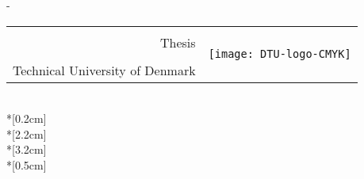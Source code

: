 
\thispagestyle{empty}             %
\calccentering{\unitlength}
\begin{adjustwidth*}{\unitlength}{-\unitlength}
    \begin{adjustwidth}{-0.5cm}{-0.5cm}
        \scshape
        \begin{flushright}
            \scriptsize  %
            \def\arraystretch{1.2}
            \begin{tabular}{rc}
            & \multirow{4}{*}{\texttt{[image: DTU-logo-CMYK]}}\\[-0.1cm]
            \thesistypeabbr{} Thesis & \\
            \thesistype{} & \\
            Technical University of Denmark &
            \end{tabular}        
        \end{flushright}
        \vspace*{\fill}
        \begin{center}
        {\color{dtured}\noindent\large\MakeUppercase{\thesistitle}}\\*[0.2cm]
        \large{\MakeLowercase{\thesissubtitle}}\\*[2.2cm]
            \normalsize
            \thesisauthor\\*[3.2cm]
            \thesismonth\ \thesisyear \\*[0.5cm]
            \thesislocation
        \end{center}
        \vspace*{\fill}
    \end{adjustwidth}
\end{adjustwidth*}
\normalfont
\normalsize
